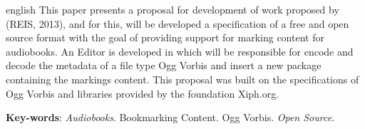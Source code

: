 \begin{resumo}[Abstract]
 \begin{otherlanguage*}{english}
  This paper presents a proposal for development of work proposed by (REIS, 2013), and for this, will be developed a specification of a free and open source format with the goal of providing support for marking content for audiobooks. An Editor is developed in which will be responsible for encode and decode the metadata of a file type Ogg Vorbis and insert a new package containing the markings content. This proposal was built on the specifications of Ogg Vorbis and libraries provided by the foundation Xiph.org.

   \vspace{\onelineskip}
 
   \noindent 
   \textbf{Key-words}: \textit{Audiobooks}. Bookmarking Content. Ogg Vorbis. \textit{Open Source}.
 \end{otherlanguage*}
\end{resumo}
